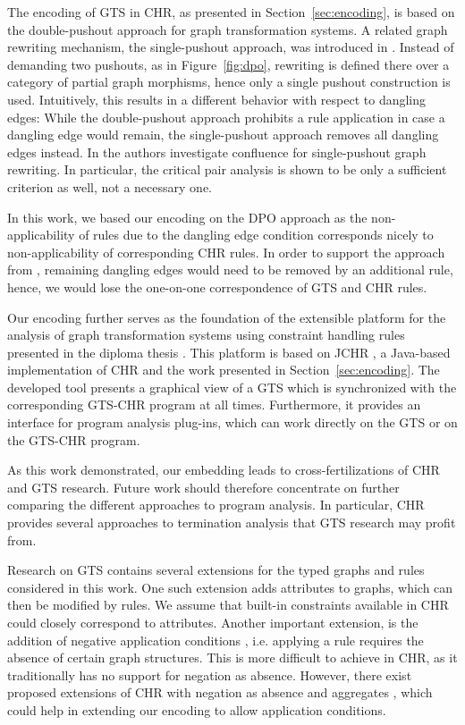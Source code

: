 \documentclass{tlp}
\begin{document}
The encoding of GTS in CHR, as presented in Section~\ref{sec:encoding}, is based
on the double-pushout approach for graph transformation systems. A related graph
rewriting mechanism, the single-pushout approach, was introduced in
\cite{loewe93}. Instead of demanding two pushouts, as in Figure~\ref{fig:dpo},
rewriting is defined there over a category of partial graph morphisms, hence only
a single pushout construction is used. Intuitively, this results in a different
behavior with respect to dangling edges: While the double-pushout approach
prohibits a rule application in case a dangling edge would remain, the
single-pushout approach removes all dangling edges instead. In \cite{Lowe1993}
the authors investigate confluence for single-pushout graph rewriting. In
particular, the critical pair analysis is shown to be only a sufficient criterion
as well, not a necessary one.

In this work, we based our encoding on the DPO approach as the non-applicability
of rules due to the dangling edge condition corresponds nicely to
non-applicability of corresponding CHR rules. In order to support the approach
from \cite{loewe93}, remaining dangling edges would need to be removed by an
additional rule, hence, we would lose the one-on-one correspondence of GTS and
CHR rules.

Our encoding further serves as the foundation of the extensible platform for the
analysis of graph transformation systems using constraint handling rules
presented in the diploma thesis \cite{Wasserthal2009}. This platform is based on
JCHR \cite{jchr}, a Java-based implementation of CHR and the work presented in
Section~\ref{sec:encoding}. The developed tool presents a graphical view of a GTS
which is synchronized with the corresponding GTS-CHR program at all times.
Furthermore, it provides an interface for program analysis plug-ins, which can
work directly on the GTS or on the GTS-CHR program.

As this work demonstrated, our embedding leads to cross-fertilizations of CHR and
GTS research. Future work should therefore concentrate on further comparing the
different approaches to program analysis. In particular, CHR provides several
approaches to termination analysis
\cite{Fruhwirth2000,voets_pilozzi_deschreye_termination_techrep08,Pilozzi2008}
that GTS research may profit from.

Research on GTS contains several extensions for the typed graphs and rules
considered in this work. One such extension adds attributes
\cite{ehrigprangetaentzer06} to graphs, which can then be modified by rules. We
assume that built-in constraints available in CHR could closely correspond to
attributes. Another important extension, is the addition of negative application
conditions \cite{ehrigprangetaentzer06}, i.e. applying a rule requires the
absence of certain graph structures. This is more difficult to achieve in CHR, as
it traditionally has no support for negation as absence. However, there exist
proposed extensions of CHR with negation as absence
\cite{vanweert_sney_schr_demoen_negation_chr06} and aggregates
\cite{vanweert_sney_demoen_aggregates_lopstr07}, which could help in extending
our encoding to allow application conditions.
\end{document}
